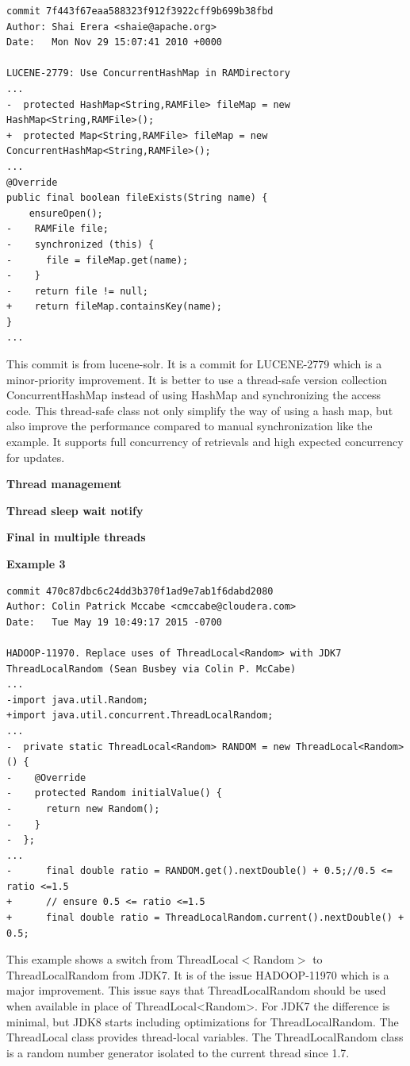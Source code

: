 \documentclass[conference]{IEEEtran}
\begin{document}
\begin{lstlisting}
commit 7f443f67eaa588323f912f3922cff9b699b38fbd
Author: Shai Erera <shaie@apache.org>
Date:   Mon Nov 29 15:07:41 2010 +0000

LUCENE-2779: Use ConcurrentHashMap in RAMDirectory
...
-  protected HashMap<String,RAMFile> fileMap = new HashMap<String,RAMFile>();
+  protected Map<String,RAMFile> fileMap = new ConcurrentHashMap<String,RAMFile>();
...
@Override
public final boolean fileExists(String name) {
    ensureOpen();
-    RAMFile file;
-    synchronized (this) {
-      file = fileMap.get(name);
-    }
-    return file != null;
+    return fileMap.containsKey(name);
}
...
\end{lstlisting}

This commit is from lucene-solr. It is a commit for LUCENE-2779 which is a minor-priority improvement. It is better to use a thread-safe version collection ConcurrentHashMap instead of using HashMap and synchronizing the access code. This thread-safe class not only simplify the way of using a hash map, but also improve the performance compared to manual synchronization like the example. It supports full concurrency of retrievals and high expected concurrency for updates.

\textbf{Thread management}

\textbf{Thread sleep wait notify}

\textbf{Final in multiple threads}

\textbf{Example 3}
\begin{lstlisting}
commit 470c87dbc6c24dd3b370f1ad9e7ab1f6dabd2080
Author: Colin Patrick Mccabe <cmccabe@cloudera.com>
Date:   Tue May 19 10:49:17 2015 -0700

HADOOP-11970. Replace uses of ThreadLocal<Random> with JDK7 ThreadLocalRandom (Sean Busbey via Colin P. McCabe)
...
-import java.util.Random;
+import java.util.concurrent.ThreadLocalRandom;
...
-  private static ThreadLocal<Random> RANDOM = new ThreadLocal<Random>() {
-    @Override
-    protected Random initialValue() {
-      return new Random();
-    }
-  };
...
-      final double ratio = RANDOM.get().nextDouble() + 0.5;//0.5 <= ratio <=1.5
+      // ensure 0.5 <= ratio <=1.5
+      final double ratio = ThreadLocalRandom.current().nextDouble() + 0.5;
\end{lstlisting}

This example shows a switch from ThreadLocal$<$Random$>$ to ThreadLocalRandom from JDK7. It is of the issue HADOOP-11970 which is a major improvement. This issue says that ThreadLocalRandom should be used when available in place of ThreadLocal<Random>. For JDK7 the difference is minimal, but JDK8 starts including optimizations for ThreadLocalRandom. The ThreadLocal class provides thread-local variables. The ThreadLocalRandom class is a random number generator isolated to the current thread since 1.7.
\end{document}

